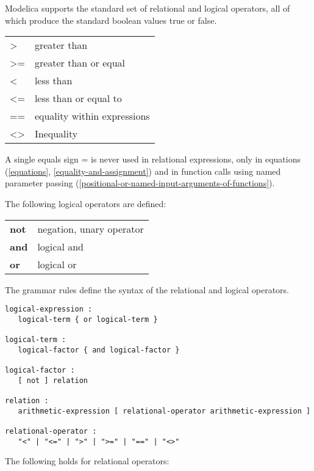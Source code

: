 Modelica supports the standard set of relational and logical operators,
all of which produce the standard boolean values true or false.

\begin{longtable}[]{ll}
\textgreater{} & greater than\\ 
\textgreater{}= & greater than or equal\\ 
\textless{} & less than\\
\textless{}= & less than or equal to\\ 
== & equality within expressions\\ 
\textless{}\textgreater{} & Inequality\\ 
\end{longtable}

A single equals sign = is never used in relational expressions, only in
equations (\autoref{equations}, \autoref{equality-and-assignment}) and in function calls using named
parameter passing (\autoref{positional-or-named-input-arguments-of-functions}).

The following logical operators are defined:

\begin{longtable}[]{ll}
\textbf{not} & negation, unary operator\\ 
\textbf{and} & logical and\\ 
\textbf{or} & logical or\\ 
\end{longtable}

The grammar rules define the syntax of the relational and logical
operators.

\begin{lstlisting}[language=grammar]
logical-expression :
   logical-term { or logical-term }
  
logical-term :
   logical-factor { and logical-factor }
   
logical-factor :
   [ not ] relation
   
relation :
   arithmetic-expression [ relational-operator arithmetic-expression ]
   
relational-operator :
   "<" | "<=" | ">" | ">=" | "==" | "<>"
\end{lstlisting}

The following holds for relational operators:

